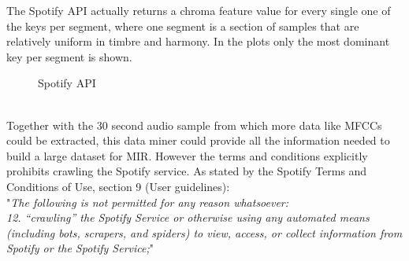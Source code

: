 The Spotify API actually returns a chroma feature value for every single one of the keys per segment, where one segment is a section of samples that are relatively uniform in timbre and harmony. In the plots only the most dominant key per segment is shown. 
\begin{figure}[htbp]
	\centering
	\caption{Spotify API}
	\label{fig:spotify}
\end{figure}
\FloatBarrier
\ \\
Together with the 30 second audio sample from which more data like MFCCs could be extracted, this data miner could provide all the information needed to build a large dataset for MIR. However the terms and conditions explicitly prohibits crawling the Spotify service. As stated by the Spotify Terms and Conditions of Use, section 9 (User guidelines):\\
"\textit{The following is not permitted for any reason whatsoever:\newline
[...]\\
12. “crawling” the Spotify Service or otherwise using any automated means (including bots, scrapers, and spiders) to view, access, or collect information from Spotify or the Spotify Service;}" \cite{spottac1}\\
